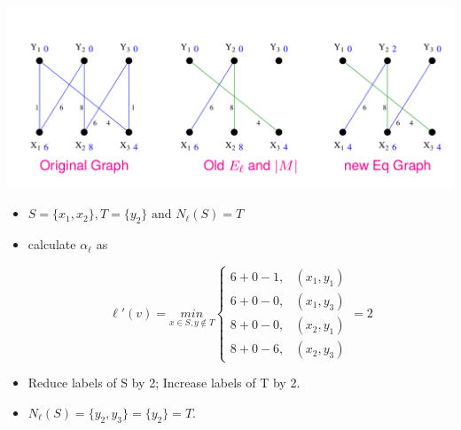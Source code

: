 \documentclass[11pt]{beamer}
\theoremstyle{definition}
\begin{document}
\begin{frame}
\includegraphics[scale=0.3]{hstep2}\cite{hungarian}
\begin{multicols}{2}
\begin{itemize}
\item $S = \{x_1,x_2\},T =\{y_2\}
\mbox{ and } N_\ell(S)=T $


\item calculate $\alpha_\ell$ as
\begin{scriptsize}
\begin{equation*}
\ell'(v)=\underset{x \in S,y\notin T}{min}
\left\{ \begin{array}{ll}
6+0-1,  & (x_1,y_1)\\
6+0-0,  &  (x_1,y_3)\\
8+0-0,  &  (x_2,y_1)\\
8+0-6,  &  (x_2,y_3)
\end{array}\right.
=2
\end{equation*}
\end{scriptsize}
\item Reduce labels of S by 2;
Increase labels of T by 2.
\item $ N_\ell (S) = \{y_2 , y_3 \} = \{y_2 \} = T $.
\end{itemize}
\end{multicols}
\end{frame}
\end{document}
